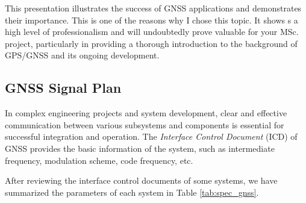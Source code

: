 This presentation illustrates the success of GNSS applications and demonstrates their importance. This is one of the reasons why I chose this topic. It shows s a high level of professionalism and will undoubtedly prove valuable for your MSc. project, particularly in providing a thorough introduction to the background of GPS/GNSS and its ongoing development.

\subsection{GNSS Signal Plan}
In complex engineering projects and system development, clear and effective communication between various subsystems and components is essential for successful integration and operation. The \textit{Interface Control Document} (ICD) of GNSS provides the basic information of the system, such as intermediate frequency, modulation scheme, code frequency, etc. 

After reviewing the interface control documents \cite{RN170, RN171, RN172, RN174, RN173, RN175} of some systems, we have summarized the parameters of each system in Table \ref{tab:spec_gnss}. 

